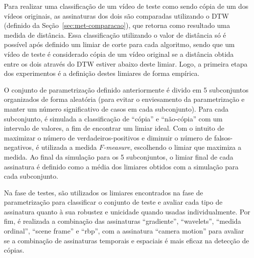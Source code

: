 Para realizar uma classificação de um vídeo de teste como sendo cópia de um dos vídeos originais, as assinaturas dos dois são comparadas utilizando o DTW (definido da Seção~\ref{sec:met-comparacao}), que retorna como resultado uma medida de distância. Essa classificação utilizando o valor de distância só é possível após definido um limiar de corte para cada algoritmo, sendo que um vídeo de teste é considerado cópia de um vídeo original se a distância obtida entre os dois através do DTW estiver abaixo deste limiar. Logo, a primeira etapa dos experimentos é a definição destes limiares de forma empírica.

O conjunto de parametrização definido anteriormente é divido em 5 subconjuntos organizados de forma aleatória (para evitar o enviesamento da parametrização e manter um número significativo de casos em cada subconjunto). Para cada subconjunto, é simulada a classificação de ``cópia'' e ``não-cópia'' com um intervalo de valores, a fim de encontrar um limiar ideal. Com o intuito de maximizar o número de verdadeiros-positivos e diminuir o número de falsos-negativos, é utilizada a medida \textit{$F$-measure}, escolhendo o limiar que maximiza a medida. Ao final da simulação para os 5 subconjuntos, o limiar final de cada assinatura é definido como a média dos limiares obtidos com a simulação para cada subconjunto.

Na fase de testes, são utilizados os limiares encontrados na fase de parametrização para classificar o conjunto de teste e avaliar cada tipo de assinatura quanto à sua robustez e unicidade quando usadas individualmente. Por fim, é realizada a combinação das assinaturas ``gradiente'', ``wavelets'', ``medida ordinal'', ``scene frame'' e ``rbp'', com a assinatura ``camera motion'' para avaliar se a combinação de assinaturas temporais e espaciais é mais eficaz na detecção de cópias.
